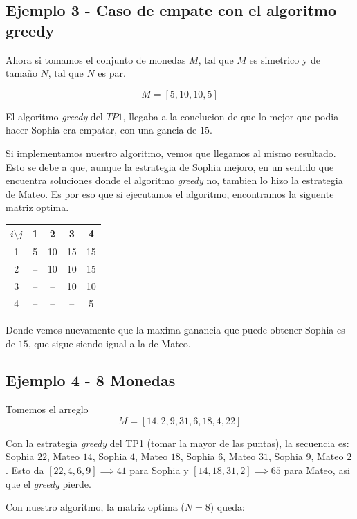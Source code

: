 \subsection{Ejemplo 3 - Caso de empate con el algoritmo greedy}

Ahora si tomamos el conjunto de monedas $M$, tal que $M$ es simetrico y de tamaño $N$, tal que $N$ es par.

\[
M = [5, 10, 10, 5]
\]

El algoritmo \textit{greedy} del $TP1$, llegaba a la conclucion de que lo mejor que podia hacer Sophia era empatar, con una gancia de $15$.

Si implementamos nuestro algoritmo, vemos que llegamos al mismo resultado. Esto se debe a que, aunque la estrategia de Sophia mejoro, en un sentido que encuentra soluciones donde el algoritmo \textit{greedy} no, tambien lo hizo la estrategia de Mateo. Es por eso que si ejecutamos el algoritmo, encontramos la siguente matriz optima.

\begin{table}[H]
\centering
\begin{tabular}{ccccc}
\toprule
$i \setminus j$ & 1 & 2 & 3 & 4 \\
\midrule
1 &  5 & 10 & 15 & 15 \\
2 & -- & 10 & 10 & 15 \\
3 & -- & -- & 10 & 10 \\
4 & -- & -- & -- &  5 \\
\bottomrule
\end{tabular}
\end{table}

Donde vemos nuevamente que la maxima ganancia que puede obtener Sophia es de $15$, que sigue siendo igual a la de Mateo.

\subsection{Ejemplo 4 - 8 Monedas}
 
Tomemos el arreglo
\[
M = [14, 2, 9, 31, 6, 18, 4, 22]
\]
 
Con la estrategia \textit{greedy} del TP1 (tomar la mayor de las puntas), la secuencia es: Sophia $22$, Mateo $14$, Sophia $4$, Mateo $18$, Sophia $6$, Mateo $31$, Sophia $9$, Mateo $2$. Esto da $[22, 4, 6, 9] \implies 41$ para Sophia y $[14, 18, 31, 2] \implies 65$ para Mateo, asi que el \textit{greedy} pierde.
 
Con nuestro algoritmo, la matriz optima ($N = 8$) queda:
 

